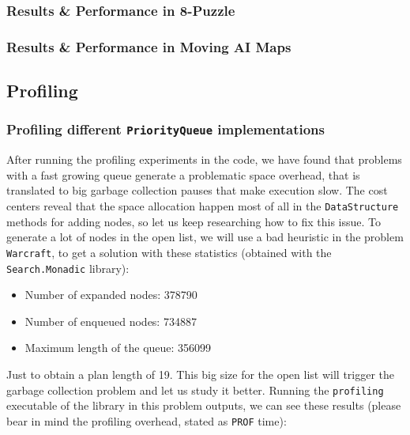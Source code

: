 \subsubsection{Results \& Performance in 8-Puzzle}

\subsubsection{Results \& Performance in Moving AI Maps}


\subsection{Profiling}

\subsubsection{Profiling different \texttt{PriorityQueue} implementations}


After running the profiling experiments in the code, we have found that
problems with a fast growing queue generate a problematic space overhead, that
is translated to big garbage collection pauses that make execution slow. The
cost centers reveal that the space allocation happen most of all in the
\texttt{DataStructure} methods for adding nodes, so let us keep researching how
to fix this issue. To generate a lot of nodes in the open list, we will use a
bad heuristic in the problem \texttt{Warcraft}, to get a solution with these
statistics (obtained with the \texttt{Search.Monadic} library):

\begin{itemize}
 \item Number of expanded nodes: 378790
 \item Number of enqueued nodes: 734887
 \item Maximum length of the queue: 356099
\end{itemize}

Just to obtain a plan length of 19. This big size for the open list will
trigger the garbage collection problem and let us study it better. Running the
\texttt{profiling} executable of the library in this problem outputs, we can
see these results (please bear in mind the profiling overhead, stated as
\texttt{PROF} time):\\

